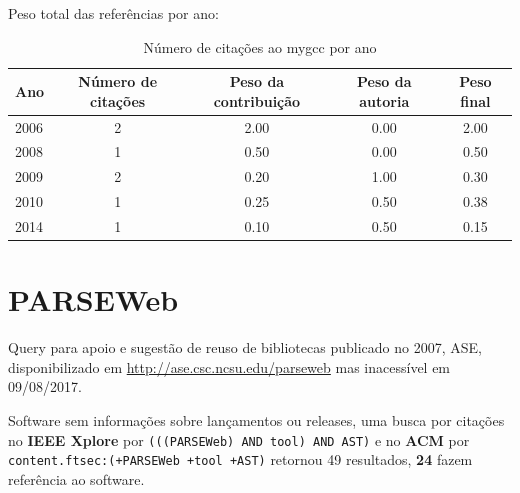 Peso total das referências por ano:

\begin{table}[h]
\caption{Número de citações ao mygcc por ano}
\centering
\begin{tabular}{| l | c | c | c | c |}
  \hline
  Ano & Número de citações & Peso da contribuição & Peso da autoria & Peso final \\
  \hline
  2006
    & 2
    & 2.00
    & 0.00
    & 2.00 \\
  2008
    & 1
    & 0.50
    & 0.00
    & 0.50 \\
  2009
    & 2
    & 0.20
    & 1.00
    & 0.30 \\
  2010
    & 1
    & 0.25
    & 0.50
    & 0.38 \\
  2014
    & 1
    & 0.10
    & 0.50
    & 0.15 \\
  \hline
\end{tabular}
\end{table}


\section{PARSEWeb}

Query para apoio e sugestão de reuso de bibliotecas
publicado no 2007, ASE,
disponibilizado em \url{http://ase.csc.ncsu.edu/parseweb}
mas inacessível em 09/08/2017.

Software sem informações sobre lançamentos ou releases,
uma busca por citações no {\bf IEEE Xplore} por
\texttt{(((PARSEWeb) AND tool) AND AST)}
e no {\bf ACM} por
\texttt{content.ftsec:(+PARSEWeb +tool +AST)}
retornou
49 resultados,
{\bf 24} fazem referência ao software.

